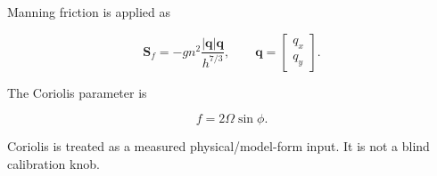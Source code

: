 Manning friction is applied as

\begin{equation}
\label{eq:manning-friction-source}
\mathbf S_f=
-
g n^2
\frac{
|\mathbf q|\mathbf q
}{
h^{7/3}
},
\qquad
\mathbf q=
\begin{bmatrix}
q_x\\
q_y
\end{bmatrix}.
\end{equation}

The Coriolis parameter is

\begin{equation}
\label{eq:coriolis-definition}
f=2\Omega\sin\phi .
\end{equation}

Coriolis is treated as a measured physical/model-form input. It is not a blind calibration knob.
